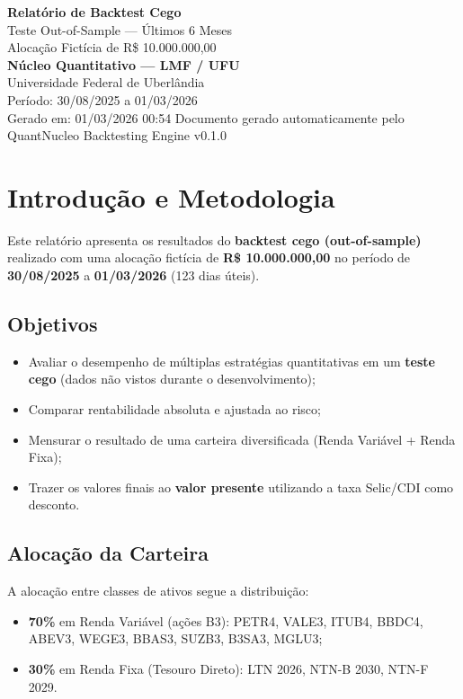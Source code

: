 \documentclass[a4paper, 12pt]{article}
\begin{document}
\begin{titlepage}
\centering
\vspace*{3cm}
{\Huge\bfseries\textcolor{azulescuro}{Relatório de Backtest Cego}\\[0.5cm]}
{\LARGE Teste Out-of-Sample — Últimos 6 Meses\\[1cm]}
{\Large Alocação Fictícia de R\$ 10.000.000,00\\[2cm]}
{\large
\textbf{Núcleo Quantitativo — LMF / UFU}\\
Universidade Federal de Uberlândia\\[1cm]
Período: 30/08/2025 a 01/03/2026\\
Gerado em: 01/03/2026 00:54
}
\vfill
{\footnotesize Documento gerado automaticamente pelo QuantNucleo Backtesting Engine v0.1.0}
\end{titlepage}

\tableofcontents
\newpage

\section{Introdução e Metodologia}

Este relatório apresenta os resultados do \textbf{backtest cego (out-of-sample)} realizado
com uma alocação fictícia de \textbf{R\$ 10.000.000,00} no período de \textbf{30/08/2025} a \textbf{01/03/2026} (123 dias úteis).

\subsection{Objetivos}
\begin{itemize}
    \item Avaliar o desempenho de múltiplas estratégias quantitativas em um \textbf{teste cego}
          (dados não vistos durante o desenvolvimento);
    \item Comparar rentabilidade absoluta e ajustada ao risco;
    \item Mensurar o resultado de uma carteira diversificada (Renda Variável + Renda Fixa);
    \item Trazer os valores finais ao \textbf{valor presente} utilizando a taxa Selic/CDI como desconto.
\end{itemize}

\subsection{Alocação da Carteira}
A alocação entre classes de ativos segue a distribuição:
\begin{itemize}
    \item \textbf{70\%} em Renda Variável (ações B3):
          PETR4, VALE3, ITUB4, BBDC4, ABEV3, WEGE3, BBAS3, SUZB3, B3SA3, MGLU3;
    \item \textbf{30\%} em Renda Fixa (Tesouro Direto):
          LTN 2026, NTN-B 2030, NTN-F 2029.
\end{itemize}
\end{document}
